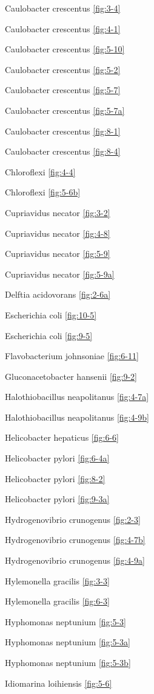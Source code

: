 \documentclass[]{tufte-book}
\begin{document}
Caulobacter crescentus \ref{fig:3-4}

Caulobacter crescentus \ref{fig:4-1}

Caulobacter crescentus \ref{fig:5-10}

Caulobacter crescentus \ref{fig:5-2}

Caulobacter crescentus \ref{fig:5-7}

Caulobacter crescentus \ref{fig:5-7a}

Caulobacter crescentus \ref{fig:8-1}

Caulobacter crescentus \ref{fig:8-4}

Chloroflexi \ref{fig:4-4}

Chloroflexi \ref{fig:5-6b}

Cupriavidus necator \ref{fig:3-2}

Cupriavidus necator \ref{fig:4-8}

Cupriavidus necator \ref{fig:5-9}

Cupriavidus necator \ref{fig:5-9a}

Delftia acidovorans \ref{fig:2-6a}

Escherichia coli \ref{fig:10-5}

Escherichia coli \ref{fig:9-5}

Flavobacterium johnsoniae \ref{fig:6-11}

Gluconacetobacter hansenii \ref{fig:9-2}

Halothiobacillus neapolitanus \ref{fig:4-7a}

Halothiobacillus neapolitanus \ref{fig:4-9b}

Helicobacter hepaticus \ref{fig:6-6}

Helicobacter pylori \ref{fig:6-4a}

Helicobacter pylori \ref{fig:8-2}

Helicobacter pylori \ref{fig:9-3a}

Hydrogenovibrio crunogenus \ref{fig:2-3}

Hydrogenovibrio crunogenus \ref{fig:4-7b}

Hydrogenovibrio crunogenus \ref{fig:4-9a}

Hylemonella gracilis \ref{fig:3-3}

Hylemonella gracilis \ref{fig:6-3}

Hyphomonas neptunium \ref{fig:5-3}

Hyphomonas neptunium \ref{fig:5-3a}

Hyphomonas neptunium \ref{fig:5-3b}

Idiomarina loihiensis \ref{fig:5-6}
\end{document}
